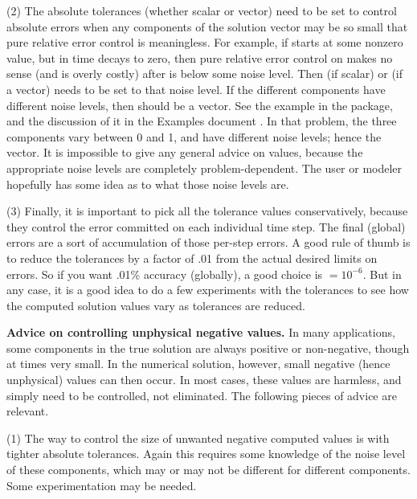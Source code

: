 (2) The absolute tolerances  (whether scalar or vector) need to
be set to control absolute errors when any components of the solution
vector  may be so small that pure relative error control is
meaningless.  For example, if  starts at some nonzero value, but in time
decays to zero, then pure relative error control on  makes no sense
(and is overly costly) after  is below some noise level.  Then
 (if scalar) or  (if a vector) needs to be set to that
noise level.  If the different components have different noise levels,
then  should be a vector.  See the example  in the
{\idas} package, and the discussion of it in the {\idas} Examples document
\cite{idas_ex}.
In that problem, the three components vary between 0 and 1, and have
different noise levels; hence the  vector.  It is impossible to
give any general advice on  values, because the appropriate noise
levels are completely problem-dependent.  The user or modeler hopefully has
some idea as to what those noise levels are.

(3) Finally, it is important to pick all the tolerance values conservatively,
because they control the error committed on each individual time step.
The final (global) errors are a sort of accumulation of those
per-step errors.  A good rule of thumb is to reduce the tolerances by a
factor of .01 from the actual desired limits on errors.  So if you
want .01\% accuracy (globally), a good choice is $=10^{-6}$.
But in any case, it is a good idea to do a few experiments with
the tolerances to see how the computed solution values vary as
tolerances are reduced.

\vspace{0.1in}
{\bf Advice on controlling unphysical negative values.}
In many applications, some components in the true solution are always
positive or non-negative, though at times very small.  In the numerical
solution, however, small negative (hence unphysical) values can then
occur.  In most cases, these values are harmless, and simply need to
be controlled, not eliminated. The following pieces of advice are relevant.

(1) The way to control the size of unwanted negative computed values
is with tighter absolute tolerances.  Again this requires some
knowledge of the noise level of these components, which may or may not
be different for different components.  Some experimentation may be
needed.

